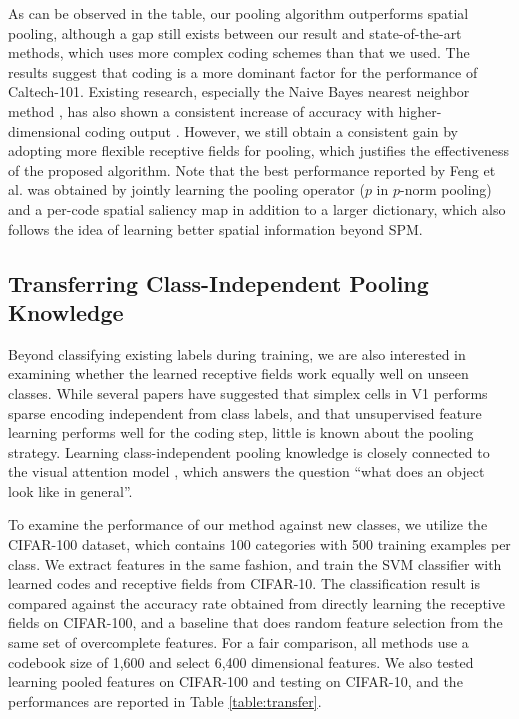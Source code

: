 As can be observed in the table, our pooling algorithm outperforms spatial pooling, although a gap still exists between our result and state-of-the-art methods, which uses more complex coding schemes than that we used. The results suggest that coding is a more dominant factor for the performance of Caltech-101. Existing research, especially the Naive Bayes nearest neighbor method \cite{boiman2008defense}, has also shown a consistent increase of accuracy with higher-dimensional coding output \cite{Boureau:2011tz,yang2010efficient}.
However, we still obtain a consistent gain by adopting more flexible receptive fields for pooling, which justifies the effectiveness of the proposed algorithm. Note that the best performance reported by Feng et al. \cite{Feng:2011wv} was obtained by jointly learning the pooling operator ($p$ in $p$-norm pooling) and a per-code spatial saliency map in addition to a larger dictionary, which also follows the idea of learning better spatial information beyond SPM.


\subsection{Transferring Class-Independent Pooling Knowledge}
Beyond classifying existing labels during training, we are also interested in examining whether the learned receptive fields work equally well on unseen classes. While several papers have suggested that simplex cells in V1 performs sparse encoding independent from class labels, and that unsupervised feature learning performs well for the coding step, little is known about the pooling strategy. Learning class-independent pooling knowledge is closely connected to the visual attention model \cite{Itti:2001wa}, which answers the question ``what does an object look like in general''.

To examine the performance of our method against new classes, we utilize the CIFAR-100 dataset, which contains 100 categories with 500 training examples per class. We extract features in the same fashion, and train the SVM classifier with learned codes and receptive fields from CIFAR-10. The classification result is compared against the accuracy rate obtained from directly learning the receptive fields on CIFAR-100, and a baseline that does random feature selection from the same set of overcomplete features. For a fair comparison, all methods use a codebook size of 1,600 and select 6,400 dimensional features. We also tested learning pooled features on CIFAR-100 and testing on CIFAR-10, and the performances are reported in Table \ref{table:transfer}.

